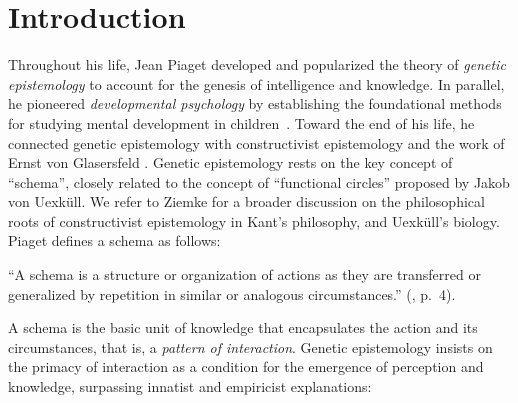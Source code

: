 \documentclass[runningheads]{llncs}
\begin{document}
\section{Introduction}
\label{sec:intro}
%
Throughout his life, Jean Piaget developed and popularized the theory of \textit{genetic epistemology} \cite{piaget_principles_1997}  to account for the genesis of intelligence and knowledge. 
In parallel, he pioneered \textit{developmental psychology} by establishing the foundational methods for studying mental development in children~\cite{piaget_origins_1955,piaget_reality_1955}.
Toward the end of his life, he connected genetic epistemology with constructivist epistemology and the work of Ernst von Glasersfeld \cite{glasersfeld_radical_1997}. 
Genetic epistemology rests on the key concept of ``schema'', closely related to the concept of ``functional circles'' proposed by Jakob von Uexküll.
We refer to Ziemke \cite{ziemke_construction_2001} for a broader discussion on the philosophical roots of constructivist epistemology in Kant's philosophy, and Uexküll's biology.  
Piaget defines a schema as follows: 
\\

\begin{adjustwidth}{1cm}{1cm}
``A schema is a structure or organization of actions as they are transferred or generalized by repetition in similar or analogous circumstances.''
(\cite{piaget_psychology_1969}, p.~4).
\\ 
\end{adjustwidth}

A schema is the basic unit of knowledge that encapsulates the action and its circumstances, that is, a \textit{pattern of interaction}. 
Genetic epistemology insists on the primacy of interaction as a condition for the emergence of perception and knowledge, 
surpassing innatist and empiricist explanations:
\\
\end{document}
